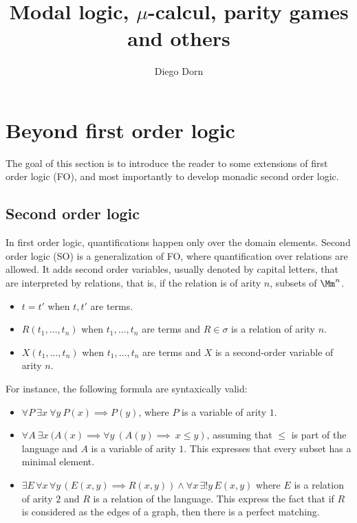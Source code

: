 

\title{Modal logic, $\mu$-calcul, parity games and others}
\author{Diego Dorn}



\maketitle

\section{Beyond first order logic}

The goal of this section is to introduce the reader
to some extensions of first order logic (FO),
and most importantly to develop monadic second order logic.

\subsection{Second order logic}

In first order logic, quantifications happen only over the
domain elements.
Second order logic (SO) is a generalization of FO,
where quantification over relations are allowed.
It adds second order variables, usually denoted by capital
letters, that are interpreted by relations, that is,
if the relation is of arity $n$, subsets of $\Mm^n$.
\begin{itemize}
    \item $t = t'$ when $t, t'$ are terms.
    \item $R(t_1, \dots, t_n)$ when $t_1, \dots, t_n$ are terms
        and $R \in \sigma$ is a relation of arity $n$.
    \item $X(t_1, \dots, t_n)$ when $t_1, \dots, t_n$ are terms
        and $X$ is a second-order variable of arity $n$.
\end{itemize}
For instance, the following formula are syntaxically valid:
\begin{itemize}
    \item $\forall P~ \exists x~ \forall y~ P(x) \implies P(y)$,
        where $P$ is a variable of arity $1$.
    \item $\forall A ~ \exists x ~
            (A(x) \implies \forall y ~
                (A(y) \implies ~ x \leq y) $,
        assuming that $\leq$ is part of the language
        and $A$ is a variable of arity $1$.
        This expresses that every subset has a minimal element.
    \item $\exists E\, \forall x\, \forall y \,
        (E(x, y) \implies R(x, y)) \wedge \forall x \, \exists! y \, E(x, y)$
        where $E$ is a relation of arity $2$ and $R$ is a relation of the language.
        This express the fact that if $R$ is considered as the edges of a graph,
        then there is a perfect matching.
\end{itemize}

